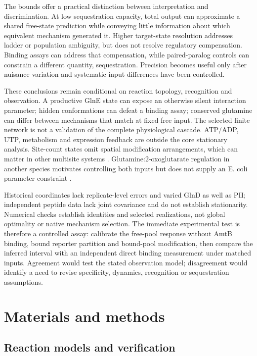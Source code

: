 \documentclass[10pt,letterpaper]{article}
\begin{document}
The bounds offer a practical distinction between interpretation and discrimination. At low sequestration capacity, total output can approximate a shared free-state prediction while conveying little information about which equivalent mechanism generated it. Higher target-state resolution addresses ladder or population ambiguity, but does not resolve regulatory compensation. Binding assays can address that compensation, while paired-paralog controls can constrain a different quantity, sequestration. Precision becomes useful only after nuisance variation and systematic input differences have been controlled.

These conclusions remain conditional on reaction topology, recognition and observation. A productive GlnE state can expose an otherwise silent interaction parameter; hidden conformations can defeat a binding assay; conserved glutamine can differ between mechanisms that match at fixed free input. The selected finite network is not a validation of the complete physiological cascade. ATP/ADP, UTP, metabolism and expression feedback are outside the core stationary analysis. Site-count states omit spatial modification arrangements, which can matter in other multisite systems \cite{r41}. Glutamine:2-oxoglutarate regulation in another species motivates controlling both inputs but does not supply an E. coli parameter constraint \cite{r75}.

Historical coordinates lack replicate-level errors and varied GlnD as well as PII; independent peptide data lack joint covariance and do not establish stationarity. Numerical checks establish identities and selected realizations, not global optimality or native mechanism selection. The immediate experimental test is therefore a controlled assay: calibrate the free-pool response without AmtB binding, bound reporter partition and bound-pool modification, then compare the inferred interval with an independent direct binding measurement under matched inputs. Agreement would test the stated observation model; disagreement would identify a need to revise specificity, dynamics, recognition or sequestration assumptions.

\section*{Materials and methods}

\subsection*{Reaction models and verification}
\end{document}
